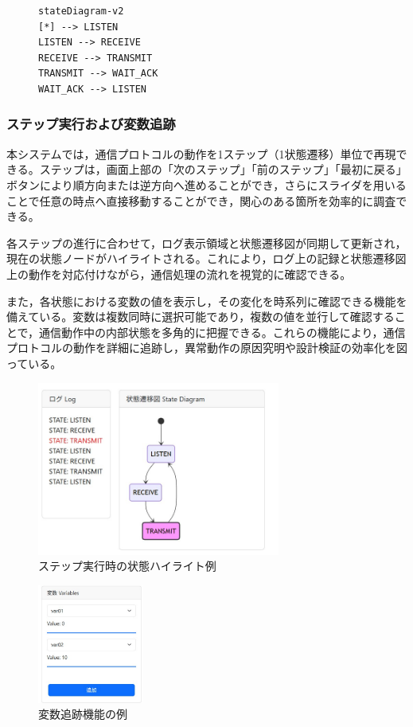 \documentclass[technicalreport]{ieicej}
\begin{document}
\begin{figure}[h]
\scriptsize
\begin{lstlisting}[caption={生成されたMermaid.jsフォーマットの例},label=mermaid-example]
stateDiagram-v2
[*] --> LISTEN
LISTEN --> RECEIVE
RECEIVE --> TRANSMIT
TRANSMIT --> WAIT_ACK
WAIT_ACK --> LISTEN
\end{lstlisting}
\end{figure}

\subsubsection{ステップ実行および変数追跡}
本システムでは，通信プロトコルの動作を1ステップ（1状態遷移）単位で再現できる。ステップは，画面上部の「次のステップ」「前のステップ」「最初に戻る」ボタンにより順方向または逆方向へ進めることができ，さらにスライダを用いることで任意の時点へ直接移動することができ，関心のある箇所を効率的に調査できる。

各ステップの進行に合わせて，ログ表示領域と状態遷移図が同期して更新され，現在の状態ノードがハイライトされる。これにより，ログ上の記録と状態遷移図上の動作を対応付けながら，通信処理の流れを視覚的に確認できる。

また，各状態における変数の値を表示し，その変化を時系列に確認できる機能を備えている。変数は複数同時に選択可能であり，複数の値を並行して確認することで，通信動作中の内部状態を多角的に把握できる。これらの機能により，通信プロトコルの動作を詳細に追跡し，異常動作の原因究明や設計検証の効率化を図っている。

\begin{figure}[h]
\centering
\includegraphics[width=80mm]{./images/step_2.jpg}
\caption{ステップ実行時の状態ハイライト例}
\label{fig:viewer-ui-step}
\end{figure}

\begin{figure}[h]
\centering
\includegraphics[width=35mm]{./images/var_log2.jpg}
\caption{変数追跡機能の例}
\label{fig:var-tracking}
\end{figure}
\end{document}

